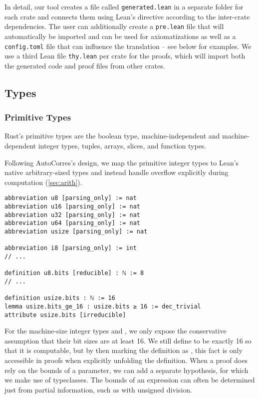 In detail, our tool creates a file called \verb!generated.lean! in a separate
folder for each crate and connects them using Lean's  directive
according to the inter-crate dependencies. The user can additionally create a
\verb!pre.lean! file that will automatically be imported and can be used for
axiomatizations as well as a \verb!config.toml! file that can influence the
translation -- see below for examples. We use a third Lean file \verb!thy.lean! per crate
for the proofs, which will import both the generated code and proof files from
other crates.

\subsection{Types}

\subsubsection{Primitive Types}

Rust's primitive types are the boolean type, machine-independent and machine-dependent integer
types, tuples, arrays, slices, and function types.

Following AutoCorres's design, we map the primitive integer types to
Lean's native arbitrary-sized types and instead handle overflow explicitly
during computation (\autoref{sec:arith}).

\begin{verbatim}
abbreviation u8 [parsing_only] := nat
abbreviation u16 [parsing_only] := nat
abbreviation u32 [parsing_only] := nat
abbreviation u64 [parsing_only] := nat
abbreviation usize [parsing_only] := nat

abbreviation i8 [parsing_only] := int
// ...

definition u8.bits [reducible] : ℕ := 8
// ...

definition usize.bits : ℕ := 16
lemma usize.bits_ge_16 : usize.bits ≥ 16 := dec_trivial
attribute usize.bits [irreducible]
\end{verbatim}

For the machine-size integer types  and , we only expose
the conservative assumption that their bit sizes are at least 16. We still define
 to be exactly 16 so that it is computable, but by then marking
the definition as \rust{[irreducible]}, this fact is only accessible in proofs
when explicitly unfolding the definition.
When a proof does rely on the bounds of a parameter, we can add a separate
hypothesis, for which we make use of typeclasses. The bounds of an expression
can often be determined just from partial information, such as with unsigned division.

